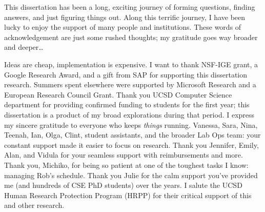 \begin{frontmatter}
\begin{epigraph}
\vspace{10pt}




\end{epigraph}

%


%
\tableofcontents
\listoffigures  %



%
%
\begin{acknowledgements}
This dissertation has been a long, exciting journey of forming questions, finding answers, and just figuring things out. Along this terrific journey, I have been lucky to enjoy the support of many people and institutions. These words of acknowledgement are just some rushed thoughts; my gratitude goes way broader and deeper…

Ideas are cheap, implementation is expensive. I want to thank NSF-IGE grant, a Google Research Award, and a gift from SAP for supporting this dissertation research. Summers spent elsewhere were supported by Microsoft Research and a European Research Council Grant. Thank you UCSD Computer Science department for providing confirmed funding to students for the first year; this dissertation is a product of my broad explorations during that period. I express my sincere gratitude to everyone who keeps \textit{things} running. Vanessa, Sara, Nina, Teenah, Ian, Olga, Clint, student assistants, and the broader Lab Ops team: your constant support made it easier to focus on research. Thank you Jennifer, Emily, Alan, and Vidula for your seamless support with reimbursements and more. Thank you, Michiko, for being so patient at one of the toughest tasks I know: managing Rob’s schedule. Thank you Julie for the calm support you’ve provided me (and hundreds of CSE PhD students) over the years. I salute the UCSD Human Research Protection Program (HRPP) for their critical support of this and other research. 


\end{acknowledgements}
\end{frontmatter}

